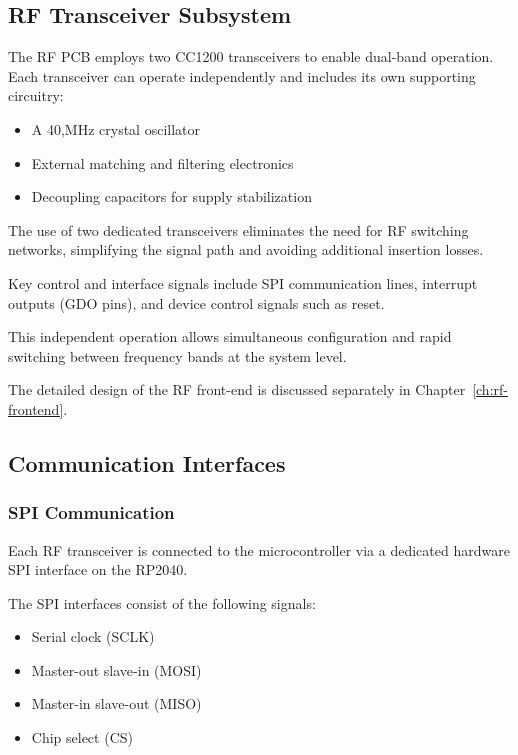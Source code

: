 \subsection{RF Transceiver Subsystem}
\label{subsec:rf_transceivers}

The RF PCB employs two CC1200 transceivers to enable dual-band operation. Each transceiver can operate independently and includes its own supporting circuitry:

\begin{itemize}
\item A 40,MHz crystal oscillator
\item External matching and filtering electronics
\item Decoupling capacitors for supply stabilization
\end{itemize}

The use of two dedicated transceivers eliminates the need for RF switching networks, simplifying the signal path and avoiding additional insertion losses.

Key control and interface signals include SPI communication lines, interrupt outputs (GDO pins), and device control signals such as reset.

This independent operation allows simultaneous configuration and rapid switching between frequency bands at the system level.

The detailed design of the RF front-end is discussed separately in Chapter~\ref{ch:rf-frontend}.

\subsection{Communication Interfaces}
\label{subsec:rf_interfaces}

\subsubsection{SPI Communication}
\label{subsubsec:rf_spi}

Each RF transceiver is connected to the microcontroller via a dedicated hardware SPI interface on the RP2040.

The SPI interfaces consist of the following signals:

\begin{itemize}
\item Serial clock (SCLK)
\item Master-out slave-in (MOSI)
\item Master-in slave-out (MISO)
\item Chip select (CS)
\end{itemize}

